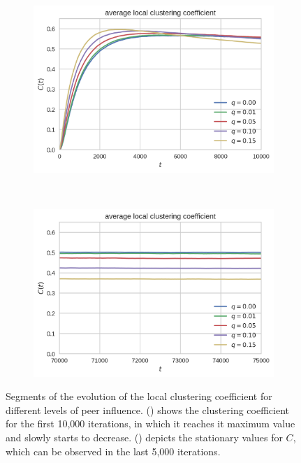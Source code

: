 \begin{figure}[htbp]
\centering
\begin{subfigure}[b]{0.485\textwidth}
  \includegraphics[width=\textwidth]{figures/avg-local-cc-start}
  \caption{}
  \label{fig:avg-local-cc-start}
\end{subfigure}
~
\begin{subfigure}[b]{0.485\textwidth}
  \includegraphics[width=\textwidth]{figures/avg-local-cc-end}
  \caption{}
\label{fig:avg-local-cc-end}
\end{subfigure}

\caption[Segments of the average local clustering coefficient evolution]{Segments of the evolution of the local clustering coefficient for different levels of peer influence. () shows the clustering coefficient for the first 10,000 iterations, in which it reaches it maximum value and slowly starts to decrease. () depicts the stationary values for \( C \), which can be observed in the last 5,000 iterations.}
\label{fig:avg-local-cc-details}
\end{figure}


